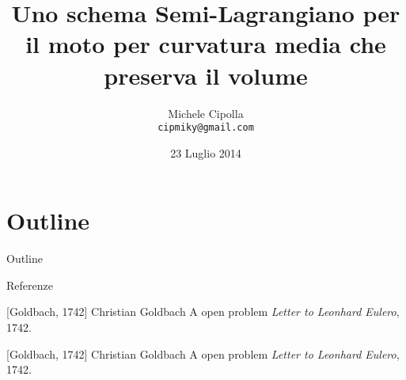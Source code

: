 \documentclass[10pt]{beamer}
\title{Uno schema Semi-Lagrangiano per il moto per curvatura media che
  preserva il volume}
\author{Michele Cipolla \\
\texttt{cipmiky@gmail.com}}
\institute[Dip. Matematica]{Univeristà la Sapienza di Roma}
\date{23 Luglio 2014}
\begin{document}
%
%
\begin{frame}
\titlepage
\end{frame}
%
%
\section*{Outline}
\begin{frame}{Outline}
\tableofcontents
\end{frame}
%
%



%
%
\begin{frame}{Referenze}
\begin{thebibliography}{Goldbach, 1742}
[Goldbach, 1742]
  Christian Goldbach
  \newblock A open problem
  \newblock \emph{Letter to Leonhard Eulero}, 1742.

[Goldbach, 1742]
  Christian Goldbach
  \newblock A open problem
  \newblock \emph{Letter to Leonhard Eulero}, 1742.
\end{thebibliography}
\end{frame}
%
%
%
\end{document}
